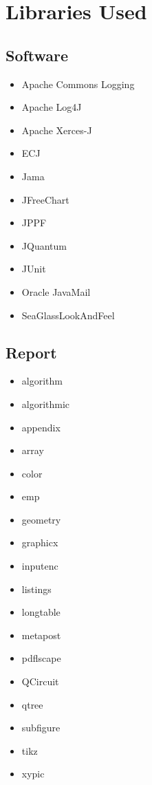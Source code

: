 % 





\chapter{Libraries Used}
\label{sec:libraries}

\section{Software}
\label{sec:appsoftlibs}
\begin{itemize}
 \item Apache Commons Logging\cite{commonlogging}
 \item Apache Log4J\cite{log4jweb}
 \item Apache Xerces-J\cite{xercesj}
 \item ECJ\cite{ecjtool}
 \item Jama\cite{javamatrix}
 \item JFreeChart\cite{jfreechart}
 \item JPPF\cite{jppfweb}
 \item JQuantum\cite{jquantum}
 \item JUnit\cite{junitweb}
 \item Oracle JavaMail\cite{javamail}
 \item SeaGlassLookAndFeel\cite{seaglass}
\end{itemize}

\section{Report}

\begin{itemize}
 \item algorithm\cite{algorithm}
 \item algorithmic\cite{algorithm}
 \item appendix\cite{appendix}
 \item array\cite{array}
 \item color\cite{color}
 \item emp\cite{emp}
 \item geometry\cite{geometry}
 \item graphicx\cite{graphicx}
 \item inputenc\cite{inputenc}
 \item listings\cite{listings}
 \item longtable\cite{longtable}
 \item metapost\cite{metapost}
 \item pdflscape\cite{pdflscape}
 \item QCircuit\cite{QCsite}
 \item qtree\cite{qtree}
 \item subfigure\cite{subfigure}
 \item tikz\cite{tikz}
 \item xypic\cite{xypiclatex}
\end{itemize}


